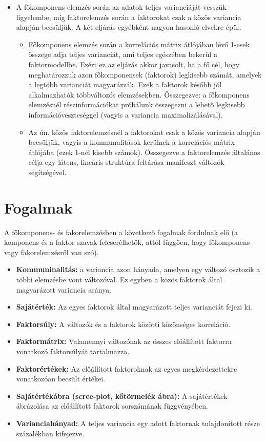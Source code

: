 \documentclass[
  letterpaper,
]{krantz}
\providecommand{\tightlist}{%
  \setlength{\itemsep}{0pt}\setlength{\parskip}{0pt}}\usepackage{longtable,booktabs,array}
\begin{document}
\begin{itemize}
\tightlist
\item
  A főkomponens elemzés során az adatok teljes varianciáját vesszük
  figyelembe, míg faktorelemzés során a faktorokat csak a közös
  variancia alapján becsüljük. A két eljárás egyébként nagyon hasonló
  elvekre épül.

  \begin{itemize}
  \tightlist
  \item
    Főkomponens elemzés során a korrelációs mátrix átlójában lévő 1-esek
    összege adja teljes varianciát, ami teljes egészében bekerül a
    faktormodellbe. Ezért ez az eljárás akkor javasolt, ha a fő cél,
    hogy meghatározzuk azon főkomponensek (faktorok) legkisebb számát,
    amelyek a legtöbb varianciát magyarázzák. Ezek a faktorok később jól
    alkalmazhatók többváltozós elemzésekben. Összegezve: a főkomponens
    elemzésnél részinformációkat próbálunk összegezni a lehető legkisebb
    információveszteséggel (vagyis a variancia maximalizálásával).
  \item
    Az ún. közös faktorelemzésnél a faktorokat csak a közös variancia
    alapján becsüljük, vagyis a kommunalitások kerülnek a korrelációs
    mátrix átlójába (ezek 1-nél kisebb számok). Összegezve a
    faktorelemzés általános célja egy látens, lineáris struktúra
    feltárása manifeszt változók segítségével.
  \end{itemize}
\end{itemize}

\hypertarget{fogalmak}{%
\section{Fogalmak}\label{fogalmak}}

A főkomponens- és fakorelemzésben a következő fogalmak fordulnak elő (a
komponens és a faktor szavak felcserélhetők, attól függően, hogy
főkomponens- vagy fakorelemzésről van szó).

\begin{itemize}
\tightlist
\item
  \textbf{Kommuninalitás:} a variancia azon hányada, amelyen egy változó
  osztozik a többi elemzésbe vont változóval. Ez egyben a közös faktorok
  által magyarázott variancia aránya.
\item
  \textbf{Sajátérték:} Az egyes faktorok által magyarázott teljes
  varianciát fejezi ki.
\item
  \textbf{Faktorsúly:} A változók és a faktorok közötti közönséges
  korreláció.
\item
  \textbf{Faktormátrix:} Valamennyi változónak az összes előállított
  faktorra vonatkozó faktorsúlyát tartalmazza.
\item
  \textbf{Faktorértékek:} Az előállított faktoroknak az egyes
  megkérdezettekre vonatkozóan becsült értékei.
\item
  \textbf{Sajátértékábra (scree-plot, kőtörmelék ábra):} A sajátértékek
  ábrázolása az előállított faktorok sorszámának függvényében.
\item
  \textbf{Varianciahányad:} A teljes variancia egy adott faktornak
  tulajdonított része százalékban kifejezve.
\end{itemize}
\end{document}
